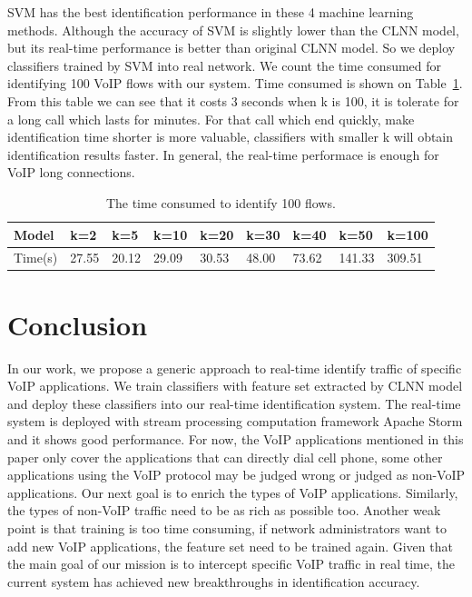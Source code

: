 \documentclass[conference]{IEEEtran}
\begin{document}
SVM has the best identification performance in these 4 machine learning methods. Although the accuracy of SVM is slightly lower than the CLNN model, but its real-time performance is better than original CLNN model. So we deploy classifiers trained by SVM into real network. We count the time consumed for identifying 100 VoIP flows with our system. Time consumed is shown on Table~\ref{tab:time4folws}. From this table we can see that it costs 3 seconds when k is 100, it is tolerate for a long call which lasts for minutes. For that call which end quickly, make identification time shorter is more valuable, classifiers with smaller k will obtain identification results faster. In general, the real-time performace is enough for VoIP long connections.
\begin{table}
  \caption{The time consumed to identify 100 flows.}
  \label{tab:time4folws}
  \centering
  \begin{tabular}{p{0.7cm}p{0.5cm}p{0.5cm}p{0.5cm}p{0.5cm}p{0.5cm}p{0.5cm}p{0.6cm}p{0.6cm}}
    \hline
    \textbf{Model} & \textbf{k=2} &\textbf{k=5}&\textbf{k=10}&\textbf{k=20}&\textbf{k=30}&\textbf{k=40}&\textbf{k=50}&\textbf{k=100}\\
    \hline
    Time(s)      & 27.55  & 20.12  &29.09&30.53&48.00&73.62&141.33&309.51  \\
    \hline
  \end{tabular}
\end{table}

\section{Conclusion}
\label{sec:conclusion}
In our work, we propose a generic approach to real-time identify traffic of specific VoIP applications. We train classifiers with feature set extracted by CLNN model and deploy these classifiers into our real-time identification system. The real-time system is deployed with stream processing computation framework Apache Storm and it shows good performance. For now, the VoIP applications mentioned in this paper only cover the applications that can directly dial cell phone, some other applications using the VoIP protocol may be judged wrong or judged as non-VoIP applications. Our next goal is to enrich the types of VoIP applications. Similarly, the types of non-VoIP traffic need to be as rich as possible too. Another weak point is that training is too time consuming, if network administrators want to add new VoIP applications, the feature set need to be trained again. Given that the main goal of our mission is to intercept specific VoIP traffic in real time, the current system has achieved new breakthroughs in identification accuracy.




\end{document}
